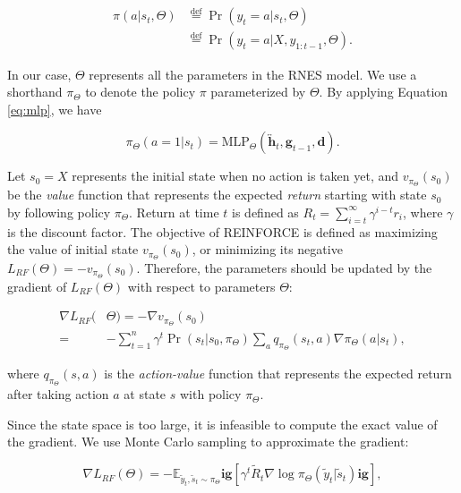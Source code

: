 \begin{align*}
	\pi(a|s_t,\Theta) &\overset{\text{def}}{=} \Pr(y_t=a|s_t,\Theta) \\
	&\overset{\text{def}}{=} \Pr(y_t=a|X, y_{1:t-1}, \Theta) .
	\end{align*}

	In our case, $\Theta$ represents all the parameters in the RNES model. We use a shorthand $\pi_{\Theta}$ to denote the policy $\pi$ parameterized by $\Theta$. By applying Equation \ref{eq:mlp}, we have

\begin{equation*}
	\pi_{\Theta}(a=1|s_t) = \text{MLP}_{\Theta}(\overleftrightarrow{\mathbf{h}}_t, \mathbf{g}_{t-1}, \mathbf{d} ) .
	\end{equation*}

	Let $s_0=X$ represents the initial state when no action is taken yet, and $v_{\pi_{\Theta}}(s_0)$ be the \emph{value} function that represents the expected \emph{return} starting with state $s_0$ by following policy $\pi_{\Theta}$. Return at time $t$ is defined as $R_t=\sum_{i=t}^{\infty} \gamma^{i-t} r_i$, where $\gamma$ is the discount factor. The objective of REINFORCE is defined as maximizing the value of initial state $v_{\pi_{\Theta}}(s_0)$, or minimizing its negative $L_{RF}(\Theta) = - v_{\pi_{\Theta}}(s_0)$. Therefore, the parameters should be updated by the gradient of $L_{RF}(\Theta)$ with respect to parameters $\Theta$:

\begin{align*}
	\nabla L_{RF}(&\Theta) = - \nabla v_{\pi_{\Theta}}(s_0) \\ 
	=& - \sum_{t=1}^{n} \gamma^t \Pr(s_t | s_0, \pi_{\Theta}) \sum_{a} q_{\pi_{\Theta}}(s_t,a) \nabla \pi_{\Theta}(a|s_t) ,
	\end{align*}

 
	where $q_{\pi_{\Theta}}(s,a)$ is the \emph{action-value} function that represents the expected return after taking action $a$ at state $s$ with policy $\pi_{\Theta}$. 

	Since the state space is too large, it is infeasible to compute the exact value of the gradient. We use Monte Carlo sampling to approximate the gradient:

\begin{equation} \label{eq:MCRF}
	\nabla L_{RF}(\Theta) = - \mathbb{E}_{\tilde{y}_t, \tilde{s}_t \sim \pi_{\Theta}} \mathbf{ig}[ \gamma^t \tilde{R}_t \nabla \log \pi_{\Theta}(\tilde{y}_t|\tilde{s}_t) \mathbf{ig}] ,
	\end{equation}


